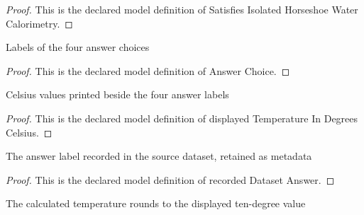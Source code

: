 \begin{proof}
  This is the declared model definition of Satisfies Isolated Horseshoe Water Calorimetry.
\end{proof}
\begin{definition}
  \label{def:physics:phyx-mini-0485:phyxminiproblems-problemphyxmini0485-answerchoice}
  Labels of the four answer choices
\end{definition}
\begin{proof}
  This is the declared model definition of Answer Choice.
\end{proof}
\begin{definition}
  \label{def:physics:phyx-mini-0485:phyxminiproblems-problemphyxmini0485-displayedtemperatureindegreescelsius}
  Celsius values printed beside the four answer labels
\end{definition}
\begin{proof}
  This is the declared model definition of displayed Temperature In Degrees Celsius.
\end{proof}
\begin{definition}
  \label{def:physics:phyx-mini-0485:phyxminiproblems-problemphyxmini0485-recordeddatasetanswer}
  The answer label recorded in the source dataset, retained as metadata
\end{definition}
\begin{proof}
  This is the declared model definition of recorded Dataset Answer.
\end{proof}
\begin{definition}
  \label{def:physics:phyx-mini-0485:phyxminiproblems-problemphyxmini0485-roundstodisplayedtendegrees}
  The calculated temperature rounds to the displayed ten-degree value
\end{definition}
